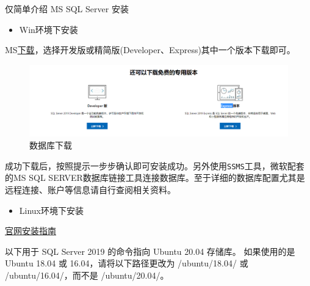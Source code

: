 \documentclass[
]{book}
\newenvironment{Shaded}{\begin{snugshade}}{\end{snugshade}}
\newcommand{\AttributeTok}[1]{\textcolor[rgb]{0.77,0.63,0.00}{#1}}
\newcommand{\CommentTok}[1]{\textcolor[rgb]{0.56,0.35,0.01}{\textit{#1}}}
\newcommand{\ExtensionTok}[1]{#1}
\newcommand{\FunctionTok}[1]{\textcolor[rgb]{0.00,0.00,0.00}{#1}}
\newcommand{\KeywordTok}[1]{\textcolor[rgb]{0.13,0.29,0.53}{\textbf{#1}}}
\newcommand{\NormalTok}[1]{#1}
\newcommand{\StringTok}[1]{\textcolor[rgb]{0.31,0.60,0.02}{#1}}
\newcommand{\VariableTok}[1]{\textcolor[rgb]{0.00,0.00,0.00}{#1}}
\providecommand{\tightlist}{%
  \setlength{\itemsep}{0pt}\setlength{\parskip}{0pt}}
\begin{document}
仅简单介绍 MS SQL Server 安装

\begin{itemize}
\tightlist
\item
  Win环境下安装
\end{itemize}

MS\href{https://www.microsoft.com/zh-cn/sql-server/sql-server-downloads}{下载}，选择开发版或精简版(Developer、Express)其中一个版本下载即可。

\begin{figure}
\centering
\includegraphics{./picture/chap2/ms install.png}
\caption{数据库下载}
\end{figure}

成功下载后，按照提示一步步确认即可安装成功。另外使用\texttt{SSMS}工具，微软配套的MS SQL SERVER数据库链接工具连接数据库。至于详细的数据库配置尤其是远程连接、账户等信息请自行查阅相关资料。

\begin{itemize}
\tightlist
\item
  Linux环境下安装
\end{itemize}

\href{https://docs.microsoft.com/zh-cn/sql/linux/sql-server-linux-setup?view=sql-server-ver15}{官网安装指南}

以下用于 SQL Server 2019 的命令指向 Ubuntu 20.04 存储库。 如果使用的是 Ubuntu 18.04 或 16.04，请将以下路径更改为 /ubuntu/18.04/ 或 /ubuntu/16.04/，而不是 /ubuntu/20.04/。

\begin{Shaded}
\end{Shaded}
\end{document}
